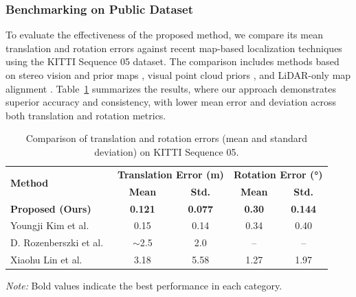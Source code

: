 \subsubsection{Benchmarking on Public Dataset}

To evaluate the effectiveness of the proposed method, we compare its mean translation and rotation errors against recent map-based localization techniques using the KITTI Sequence 05 dataset. The comparison includes methods based on stereo vision and prior maps \cite{kim2018stereo}, visual point cloud priors \cite{lin2021autonomous}, and LiDAR-only map alignment \cite{Rozenberszki2020LOL}. Table~\ref{tab:kitti05-comparison} summarizes the results, where our approach demonstrates superior accuracy and consistency, with lower mean error and deviation across both translation and rotation metrics.
\begin{table}[ht]
	\centering
	\renewcommand{\arraystretch}{1.1}
	\setlength{\tabcolsep}{6pt}
	\caption{Comparison of translation and rotation errors (mean and standard deviation) on KITTI Sequence 05.}
	\label{tab:kitti05-comparison}
	\begin{tabular}{l|cc|cc}
		\toprule
		\multirow{2}{*}{\textbf{Method}} &
		\multicolumn{2}{c|}{\textbf{Translation Error (m)}} &
		\multicolumn{2}{c}{\textbf{Rotation Error (°)}} \\
		& \textbf{Mean} & \textbf{Std.} & \textbf{Mean} & \textbf{Std.} \\
		\midrule
		\textbf{Proposed (Ours)} & \textbf{0.121} & \textbf{0.077} & \textbf{0.30} & \textbf{0.144} \\
		Youngji Kim et al.~\cite{kim2018stereo} & 0.15 & 0.14 & 0.34 & 0.40 \\
		D. Rozenberszki et al.~\cite{Rozenberszki2020LOL} & $\sim$2.5 & 2.0 & -- & -- \\
		Xiaohu Lin et al.~\cite{lin2021autonomous} & 3.18 & 5.58 & 1.27 & 1.97 \\
		\bottomrule
	\end{tabular}
	\vspace{2mm}
	
	{\footnotesize \textit{Note:} Bold values indicate the best performance in each category.}
\end{table}
%
